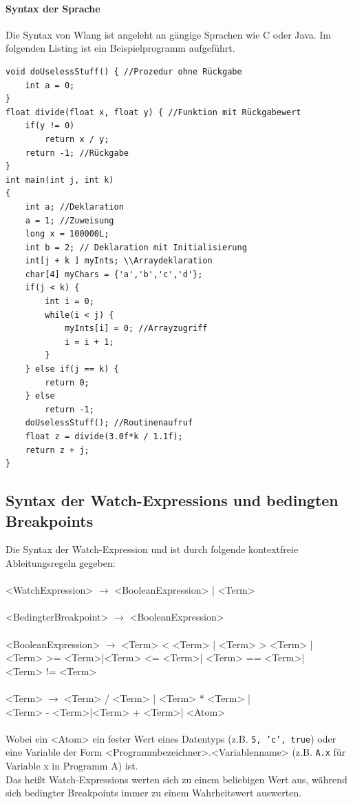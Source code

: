 \documentclass[parskip=full]{scrartcl}
\let\glsplgen\glsuseri
\begin{document}
\paragraph{Syntax der Sprache}
Die Syntax von Wlang ist angeleht an gängige Sprachen wie C oder Java. Im folgenden Listing ist ein Beispielprogramm aufgeführt. 

\begin{verbatim}
void doUselessStuff() { //Prozedur ohne Rückgabe
    int a = 0;
}
float divide(float x, float y) { //Funktion mit Rückgabewert
    if(y != 0)	
        return x / y;
    return -1; //Rückgabe
}
int main(int j, int k)
{
    int a; //Deklaration
    a = 1; //Zuweisung
    long x = 100000L; 
    int b = 2; // Deklaration mit Initialisierung
    int[j + k ] myInts; \\Arraydeklaration
    char[4] myChars = {'a','b','c','d'};
    if(j < k) {
        int i = 0;
        while(i < j) {
            myInts[i] = 0; //Arrayzugriff
            i = i + 1;
        }	
    } else if(j == k) {
        return 0;
    } else
        return -1;
    doUselessStuff(); //Routinenaufruf
    float z = divide(3.0f*k / 1.1f);
    return z + j;
}
\end{verbatim}
\newpage
\subsection{Syntax der Watch-Expressions und bedingten Breakpoints}
Die Syntax der \gls{Watch-Expression} und \glsplgen{bedingter Breakpoint} ist durch folgende kontextfreie Ableitungsregeln gegeben: \\\\
<WatchExpression> $\rightarrow$ <BooleanExpression> | <Term>\\\\
<BedingterBreakpoint> $\rightarrow$ <BooleanExpression>\\\\<BooleanExpression> $\rightarrow$ <Term> < <Term> 
| <Term> > <Term> |\\ <Term> >= <Term>|<Term> <= <Term>| <Term> == <Term>| \\<Term> != <Term>\\\\
<Term> $\rightarrow$ <Term> / <Term> 
| <Term> * <Term> |\\ <Term> - <Term>|<Term> + <Term>| <Atom>\\\\

Wobei ein <Atom> ein fester Wert eines Datentyps (z.B. \texttt{5, 'c', true}) oder eine Variable der Form <Programmbezeichner>.<Variablenname> (z.B. \texttt{A.x} für Variable x in Programm A) ist. \\
Das heißt \glspl{Watch-Expression} werten sich zu einem beliebigen Wert aus, während sich \glspl{bedingter Breakpoint} immer zu einem Wahrheitswert auswerten.


\newpage
\printglossary[style=altlist, toctitle=Glossar]
\end{document}
